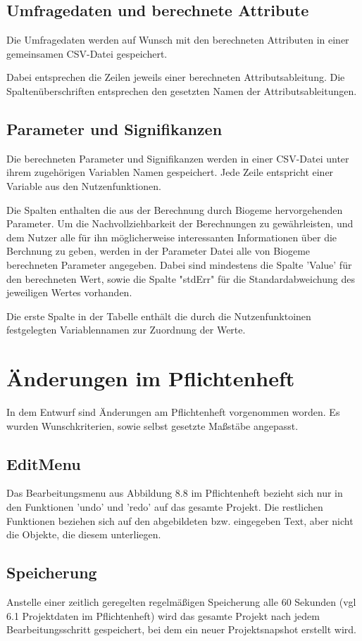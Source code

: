\documentclass{article}
\begin{document}
\subsection{Umfragedaten und berechnete Attribute}
Die Umfragedaten werden auf Wunsch mit den berechneten Attributen in einer gemeinsamen CSV-Datei gespeichert. 

Dabei entsprechen die Zeilen jeweils einer berechneten Attributsableitung. Die Spaltenüberschriften entsprechen den gesetzten Namen der Attributsableitungen. 

\subsection{Parameter und Signifikanzen}
Die berechneten Parameter und Signifikanzen werden in einer CSV-Datei unter ihrem zugehörigen Variablen Namen gespeichert. Jede Zeile entspricht einer Variable aus den Nutzenfunktionen.

Die Spalten enthalten die aus der Berechnung durch Biogeme hervorgehenden Parameter. Um die Nachvollziehbarkeit der Berechnungen zu gewährleisten, und dem Nutzer alle für ihn  möglicherweise interessanten Informationen über die Berchnung zu geben, werden in der Parameter Datei alle von Biogeme berechneten Parameter angegeben. Dabei sind mindestens die Spalte 'Value' für den berechneten Wert, sowie die Spalte "stdErr" für die Standardabweichung des jeweiligen Wertes vorhanden.

Die erste Spalte in der Tabelle enthält die durch die Nutzenfunktoinen festgelegten Variablennamen zur Zuordnung der Werte.


\section{Änderungen im Pflichtenheft}
In dem Entwurf sind Änderungen am Pflichtenheft vorgenommen worden. Es wurden Wunschkriterien, sowie selbst gesetzte Maßstäbe angepasst.

\subsection{EditMenu}
Das Bearbeitungsmenu aus Abbildung 8.8 im Pflichtenheft bezieht sich nur in den Funktionen 'undo' und 'redo' auf das gesamte Projekt. Die restlichen Funktionen beziehen sich auf den abgebildeten bzw. eingegeben Text, aber nicht die Objekte, die diesem unterliegen.

\subsection{Speicherung}
Anstelle einer zeitlich geregelten regelmäßigen Speicherung alle 60 Sekunden (vgl 6.1 Projektdaten im Pflichtenheft) wird das gesamte Projekt nach jedem Bearbeitungsschritt gespeichert, bei dem ein neuer Projektsnapshot erstellt wird.
\end{document}

